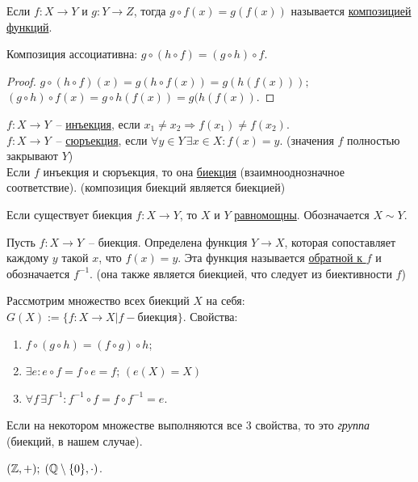 \begin{defin}
	Если $f: X \to Y$ и $g: Y \to Z$, тогда $g \circ f(x) = g(f(x))$ называется \underline{композицией функций}.
\end{defin}

\begin{claim}
	Композиция ассоциативна: $g \circ (h \circ f) = (g \circ h) \circ f$.
\end{claim}
\begin{proof}
	$g \circ (h \circ f)(x) = g(h \circ f(x)) = g(h(f(x)));$\\
	$(g \circ h) \circ f(x) = g \circ h(f(x)) = g(h(f(x)).$
\end{proof}

\begin{defin}
	$f: X \to Y$~-- \underline{инъекция}, если $x_1 \neq x_2 \Rightarrow f(x_1) \neq f(x_2)$.\\
	$f: X \to Y$~-- \underline{сюръекция}, если $\forall y \in Y\, \exists x \in X: f(x)=y$. (значения $f$ полностью закрывают $Y$)\\
	Если $f$ инъекция и сюръекция, то она \underline{биекция} (взаимнооднозначное соответствие). (композиция биекций является биекцией)
\end{defin}
\begin{defin}
	Если существует биекция $f: X \to Y$, то $X$ и $Y$ \underline{равномощны}. Обозначается $X \sim Y$.
\end{defin}
\begin{claim}
	Пусть $f: X \to Y$~-- биекция. Определена функция $Y \to X$, которая сопоставляет каждому $y$ такой $x$, что $f(x)=y$. Эта функция называется \underline{обратной к $f$} и обозначается $f^{-1}$. (она также является биекцией, что следует из биективности $f$)
\end{claim}

Рассмотрим множество всех биекций $X$ на себя: $G(X) := \{f: X \to X | f - биекция\}$. Свойства:
\begin{enumerate}
	\item $f \circ (g \circ h) = (f \circ g) \circ h$;
	\item $\exists e: e \circ f = f \circ e = f$; $(e(X)=X)$
	\item $\forall f\, \exists f^{-1}: f^{-1} \circ f = f \circ f^{-1} = e$.
\end{enumerate}
Если на некотором множестве выполняются все 3 свойства, то это \textit{группа} (биекций, в нашем случае).
\begin{ex}
	$(\mathbb{Z}, +); \; (\mathbb{Q} \setminus \{0\}, \cdot)$.
\end{ex}

